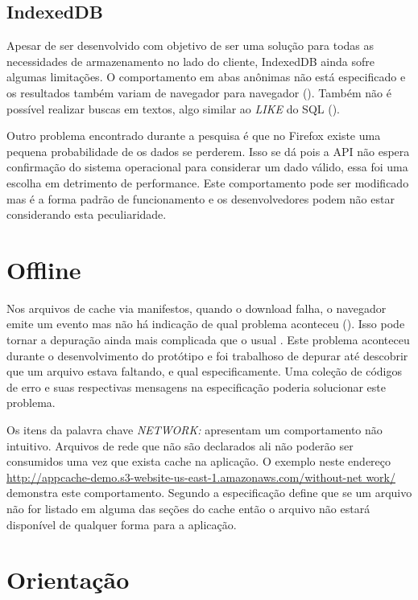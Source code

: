 \subsection{IndexedDB}

Apesar de ser desenvolvido com objetivo de ser uma solução para
todas as necessidades de armazenamento no lado do cliente, IndexedDB ainda
sofre algumas limitações. O comportamento em abas anônimas não
está especificado e os resultados também variam de navegador para
navegador (). Também não é
possível realizar buscas em textos, algo similar ao \textit{LIKE} do
SQL ().

Outro problema encontrado durante a pesquisa é que no Firefox existe
uma pequena probabilidade de os dados se perderem. Isso se dá pois a
API não espera confirmação do sistema operacional para considerar
um dado válido, essa foi uma escolha em detrimento de performance.
Este comportamento pode ser modificado mas é a forma padrão de
funcionamento e os desenvolvedores podem não estar considerando esta
peculiaridade.

\section{Offline}

Nos arquivos de cache via manifestos, quando o download falha, o
navegador emite um evento mas não há indicação de qual problema
aconteceu (). Isso pode tornar a
depuração ainda mais complicada que o usual \autocite{diveIntohtml}.
Este problema aconteceu durante o desenvolvimento do protótipo e foi
trabalhoso de depurar até descobrir que um arquivo estava faltando,
e qual especificamente. Uma coleção de códigos de erro e suas
respectivas mensagens na especificação poderia solucionar este
problema.

Os itens da palavra chave \textit{NETWORK:} apresentam um
comportamento não intuitivo. Arquivos de rede que não
são declarados ali não poderão ser consumidos uma vez
que exista cache na aplicação. O exemplo neste endereço
\url{http://appcache-demo.s3-website-us-east-1.amazonaws.com/without-net
work/} demonstra este comportamento. Segundo \citet{gameAssetManagement}
a especificação define que se um arquivo não for listado em alguma
das seções do cache então o arquivo não estará disponível de
qualquer forma para a aplicação.

\section{Orientação}

